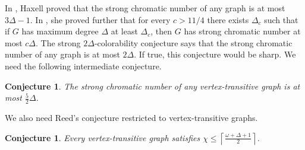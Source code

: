 \documentclass[12pt]{article}
\theoremstyle{plain}
\newtheorem{conjecture}[thm]{Conjecture}
\theoremstyle{definition}
\theoremstyle{remark}
\newcommand{\ceil}[1]{\left\lceil#1\right\rceil}
\begin{document}
In \cite{haxell2004strong}, Haxell proved that the strong chromatic number of
any graph is at most $3\Delta - 1$.  
In \cite{haxell2008strong}, she proved further that for every $c>11/4$ there
exists $\Delta_c$ such that if $G$ has maximum degree $\Delta$ at least
$\Delta_c$, then $G$ has strong chromatic number at most $c\Delta$.
The strong $2\Delta$-colorability conjecture \cite{aharoni2007independent} says
that the strong chromatic number of any graph is at most $2\Delta$.  If true,
this conjecture would be sharp. We need the following intermediate
conjecture.

\begin{conjecture}\label{StrongTransitive}
The strong chromatic number of any vertex-transitive graph is at most $\frac52 \Delta$.
\end{conjecture}

We also need Reed's conjecture \cite{reed1998omega} restricted to vertex-transitive graphs.

\begin{conjecture}\label{ReedTransitive}
Every vertex-transitive graph satisfies $\chi \leq\ceil{\frac{\omega + \Delta + 1}{2}}$.
\end{conjecture}
\end{document}
